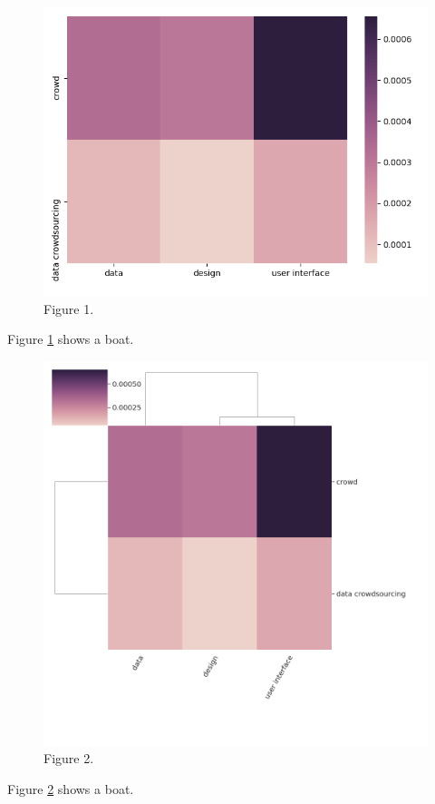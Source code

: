 \documentclass{article}
\begin{document}
\begin{figure}[!h]
  \centering
  \includegraphics[width=400 pt]{output1.png}
  \caption{Figure 1.}
  \label{fig:matrix}
\end{figure}

Figure \ref{fig:matrix} shows a boat.

\begin{figure}
  \includegraphics[width=400 pt]{output2.png}
  \caption{Figure 2.}
  \label{fig:2}
\end{figure}

Figure \ref{fig:2} shows a boat.


\end{document}
